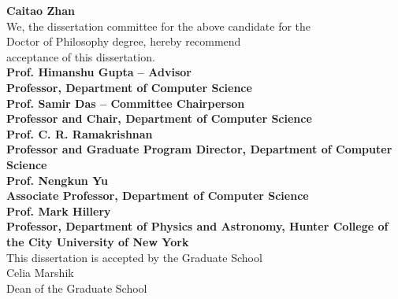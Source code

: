 \begin{center}
    \vspace{0.5cm}
    \textbf{Caitao Zhan}  \\
    \vspace{0.5cm}
    {We}, the dissertation committee for the above candidate for the  \\
    \vspace{0.25cm}
    Doctor of Philosophy degree, hereby recommend  \\
    \vspace{0.25cm}
    acceptance of this dissertation.  \\
    \vspace{1.0cm}
    \textbf{Prof. Himanshu Gupta -- Advisor} \\
    \textbf{Professor, Department of Computer Science}   \\
    \vspace{0.75cm}
    \textbf{Prof. Samir Das  -- Committee Chairperson} \\
    \textbf{Professor and Chair, Department of Computer Science}  \\
    \vspace{0.75cm}
    \textbf{Prof. C. R. Ramakrishnan}\\
    \textbf{Professor and Graduate Program Director, Department of Computer Science}   \\
    \vspace{0.75cm}
    \textbf{Prof. Nengkun Yu} \\
    \textbf{Associate Professor, Department of Computer Science} \\
    \vspace{0.75cm}
    \textbf{Prof. Mark Hillery} \\
    \textbf{Professor, Department of Physics and Astronomy, Hunter College of the City University of New York} \\
    \vspace{1cm}
    This dissertation is accepted by the Graduate School  \\
    \vspace{0.75cm}
    Celia Marshik  \\
    Dean of the Graduate School  \\
    \vspace{0.5cm}
    \eject 

  \end{center}
  
